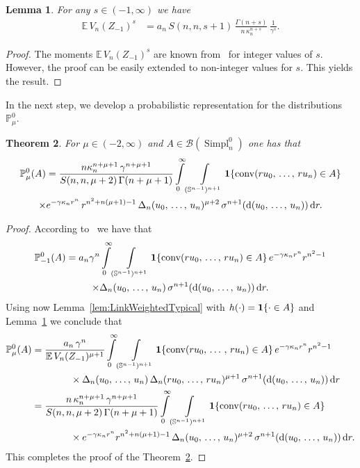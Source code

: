 \documentclass[10pt]{amsart}
\newtheorem{theo}{Theorem}[section]
\newtheorem{lemm}[theo]{Lemma}\newtheorem{prop}[theo]{Proposition}\newtheorem{coro}[theo]{Corollary}\newtheorem{conj}[theo]{Conjecture}
\theoremstyle{definition}\newtheorem{defi}[theo]{Definition}\newtheorem{rema}[theo]{Remark}\newtheorem{exam}[theo]{Example}\newtheorem{exem}[theo]{Example}\newtheorem{nota}[theo]{Notation}
\newcommand{\Sp}{\mathbb S}
\newcommand{\EE}{\mathbb{E}\,}
\newcommand{\PP}{\mathbb{P}}
\newcommand{\dd}{{\rm d}}
\DeclareMathOperator{\Simpl}{Simpl}
\newcommand{\conv}{\mathop{\mathrm{conv}}\nolimits}
\begin{document}
\begin{lemm}\label{lem:GammaMu}
For any $s\in(-1,\infty)$ we have
\begin{align*}
\EE V_n(Z_{-1})^{s} &= a_n\,S(n,n,s+1)\,\frac{\Gamma(n+s)}{n\,\kappa_n^{n+s}}\,\frac{1}{\gamma^{s}}.
\end{align*}
\end{lemm}
\begin{proof}
The moments $\EE V_n(Z_{-1})^{s}$ are known from~\cite[Theorem~10.4.5]{SW08} for integer values of $s$. However, the proof can be easily extended to non-integer values for $s$. This yields the result.
\end{proof}

In the next step, we develop a probabilistic representation for the distributions $\PP_\mu^0$.

\begin{theo}\label{thm:Representation}
For $\mu\in(-2,\infty)$ and $A\in\mathcal{B}(\Simpl_n^0)$ one has that
\begin{multline*}
\PP_\mu^0(A) = \frac{n\kappa_n^{n+\mu+1}\,\gamma^{n+\mu+1}}{S(n,n,\mu+2)\,\Gamma(n+\mu+1)}\int\limits_0^\infty\int\limits_{(\Sp^{n-1})^{n+1}}{\bf 1}\{\conv(ru_0,\,\ldots,\,ru_n)\in A\}\\
\times e^{-\gamma\kappa_nr^n}\,r^{n^2+n(\mu+1)-1}\,\Delta_n(u_0,\,\ldots,\,u_n)^{\mu+2}\,\sigma^{n+1}(\dd(u_0,\,\ldots,\,u_n))\,\dd r.
\end{multline*}
\end{theo}


\begin{proof}
According to~\cite[Theorem~10.4.4]{SW08} we have that
\begin{multline*}
\PP_{-1}^0(A)
= a_n\gamma^n\int\limits_{0}^{\infty}\int\limits_{(\Sp^{n-1})^{n+1}}{\bf 1}\{\conv(ru_0,\,\ldots,\,ru_n)\in A\}\,e^{-\gamma\kappa_nr^n}r^{n^2-1}\\
\times\Delta_n(u_0,\,\ldots,\,u_n)\,\sigma^{n+1}(\dd(u_0,\,\ldots,\,u_n))\,\dd r.
\end{multline*}
Using now Lemma~\ref{lem:LinkWeightedTypical} with $h(\cdot)={\bf 1}\{\cdot\in A\}$ and Lemma~\ref{lem:GammaMu} we conclude that
\begin{align*}
\PP_{\mu}^0(A) &= \frac{a_n\,\gamma^n}{\EE V_n(Z_{-1})^{\mu+1}}\int\limits_{0}^{\infty}\int\limits_{(\Sp^{n-1})^{n+1}}{\bf 1}\{\conv(ru_0,\,\ldots\,,\,ru_n)\in A\}\,e^{-\gamma\kappa_nr^n}r^{n^2-1}\\
&\qquad\qquad\times\Delta_n(u_0,\,\ldots,\,u_n)\,\Delta_n(ru_0,\,\ldots,\,ru_n)^{\mu+1}\,\sigma^{n+1}(\dd(u_0,\,\ldots,\,u_n))\,\dd r\\
&=\frac{n\,\kappa_n^{n+\mu+1}\,\gamma^{n+\mu+1}}{S(n,n,\mu+2)\,\Gamma(n+\mu+1)}\int\limits_{0}^{\infty}\int\limits_{(\Sp^{n-1})^{n+1}}{\bf 1}\{\conv(ru_0,\,\ldots,\,ru_n)\in A\}\\
&\qquad\qquad\times e^{-\gamma\kappa_nr^n}r^{n^2+n(\mu+1)-1}\,\Delta_n(u_0,\,\ldots,\,u_n)^{\mu+2}\,\sigma^{n+1}(\dd(u_0,\,\ldots,\,u_n))\,\dd r.
\end{align*}
This completes the proof of the Theorem~\ref{thm:Representation}.
\end{proof}
\end{document}
